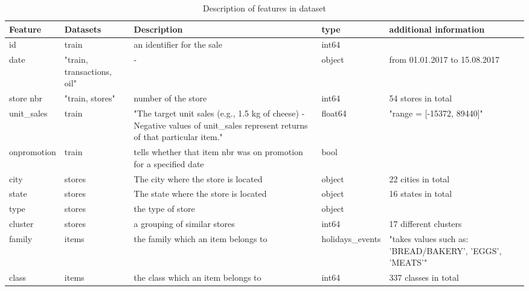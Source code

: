 \begin{table}[p]
	\centering
	\caption{Description of features in dataset}
	\label{tab:DatasetFeatures}
	\begin{tabular}{|p{2cm}|p{1.8cm}|p{3cm}|l|p{2.5cm}|}
		\hline
		\textbf{Feature} & \textbf{Datasets} & \textbf{Description} & \textbf{type} & \textbf{additional information} \\ \hline
		id & train & an identifier for the sale & int64 & ~ \\ \hline
		date & "train, transactions,  oil" & - & object & from 01.01.2017 to 15.08.2017 \\ \hline
		store nbr & "train, stores" & number of the store & int64 & 54 stores in total \\ \hline
		unit\_sales & train & "The target unit sales (e.g., 1.5 kg of cheese) - Negative values of unit\_sales represent returns of that particular item." & float64 & "range = [-15372, 89440]" \\ \hline
		onpromotion & train & tells whether that item nbr was on promotion for a specified date & bool & ~ \\ \hline
		city & stores & The city where the store is located & object & 22 cities in total \\ \hline
		state & stores & The state where the store is located & object & 16 states in total \\ \hline
		type & stores & the type of store & object & ~ \\ \hline
		cluster & stores & a grouping of similar stores & int64 & 17 different clusters \\ \hline
		family & items & the family which an item belongs to & holidays\_events & "takes values such as: 'BREAD/BAKERY', 'EGGS', 'MEATS'" \\ \hline
		class & items & the class which an item belongs to & int64 & 337 classes in total \\ \hline
	\end{tabular}
\end{table}

